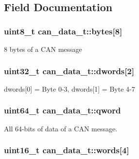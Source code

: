\subsection{Field Documentation}
\subsubsection[{\texorpdfstring{bytes}{bytes}}]{\setlength{\rightskip}{0pt plus 5cm}uint8\+\_\+t can\+\_\+data\+\_\+t\+::bytes\mbox{[}8\mbox{]}}\hypertarget{unioncan__data__t_a59f2f0065f03d0a30d43e0d4e1d8bca2}{}\label{unioncan__data__t_a59f2f0065f03d0a30d43e0d4e1d8bca2}


8 bytes of a C\+AN message 

\subsubsection[{\texorpdfstring{dwords}{dwords}}]{\setlength{\rightskip}{0pt plus 5cm}uint32\+\_\+t can\+\_\+data\+\_\+t\+::dwords\mbox{[}2\mbox{]}}\hypertarget{unioncan__data__t_a32b41652b919ee512156989478f9b993}{}\label{unioncan__data__t_a32b41652b919ee512156989478f9b993}


dwords\mbox{[}0\mbox{]} = Byte 0-\/3, dwords\mbox{[}1\mbox{]} = Byte 4-\/7 

\subsubsection[{\texorpdfstring{qword}{qword}}]{\setlength{\rightskip}{0pt plus 5cm}uint64\+\_\+t can\+\_\+data\+\_\+t\+::qword}\hypertarget{unioncan__data__t_a41667832d267ee3fd67d7b0c34054068}{}\label{unioncan__data__t_a41667832d267ee3fd67d7b0c34054068}


All 64-\/bits of data of a C\+AN message. 

\subsubsection[{\texorpdfstring{words}{words}}]{\setlength{\rightskip}{0pt plus 5cm}uint16\+\_\+t can\+\_\+data\+\_\+t\+::words\mbox{[}4\mbox{]}}\hypertarget{unioncan__data__t_a9631170190ce3ecad7370b651ab70b3f}{}\label{unioncan__data__t_a9631170190ce3ecad7370b651ab70b3f}


